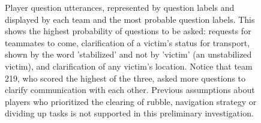\begin{figure}[h!]
    \centering
    \caption{%
        Player question utterances, represented by question labels and
        displayed by each team and the most probable question labels. This
        shows the highest probability of questions to be asked: requests for
        teammates to come, clarification of a victim's status for transport,
        shown by the word 'stabilized' and not by 'victim' (an unstabilized
        victim), and clarification of any victim's location. Notice that team
        219, who scored the highest of the three, asked more questions to
        clarify communication with each other. Previous assumptions about
        players who prioritized the clearing of rubble, navigation strategy or
        dividing up tasks is not supported in this preliminary investigation.
    }
\end{figure}

